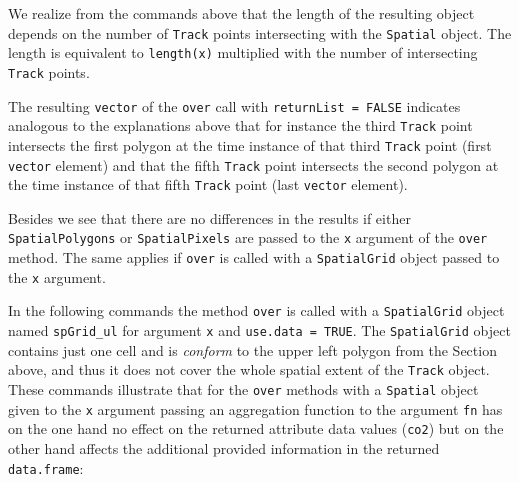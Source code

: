 \documentclass[12pt, oneside, a4paper]{scrbook}
\let\code=\texttt
\begin{document}
We realize from the commands above that the length of the resulting object depends on the number of \code{Track} points intersecting with the \code{Spatial} object. 
The length is equivalent to \code{length(x)} multiplied with the number of intersecting \code{Track} points.
\par\medskip
The resulting \code{vector} of the \code{over} call with \code{returnList = FALSE} indicates analogous to the explanations above that for instance the third \code{Track} point intersects the first polygon at the time instance of that third \code{Track} point (first \code{vector} element) and that the fifth \code{Track} point intersects the second polygon at the time instance of that fifth \code{Track} point (last \code{vector} element).
\par\medskip
Besides we see that there are no differences in the results if either \code{SpatialPolygons} or \code{SpatialPixels} are passed to the \code{x} argument of the \code{over} method. 
The same applies if \code{over} is called with a \code{SpatialGrid} object passed to the \code{x} argument.
\par\medskip
In the following commands the method \code{over} is called with a \code{SpatialGrid} object named \code{spGrid\_ul} for argument \code{x} and \code{use.data = TRUE}. The \code{SpatialGrid} object contains just one cell and is \textit{conform} to the upper left polygon from the Section above, and thus it does not cover the whole spatial extent of the \code{Track} object.
These commands illustrate that for the \code{over} methods with a \code{Spatial} object given to the \code{x} argument passing an aggregation function to the argument \code{fn} has on the one hand no effect on the returned attribute data values (\code{co2}) but on the other hand affects the additional provided information in the returned \code{data.frame}:
\end{document}
